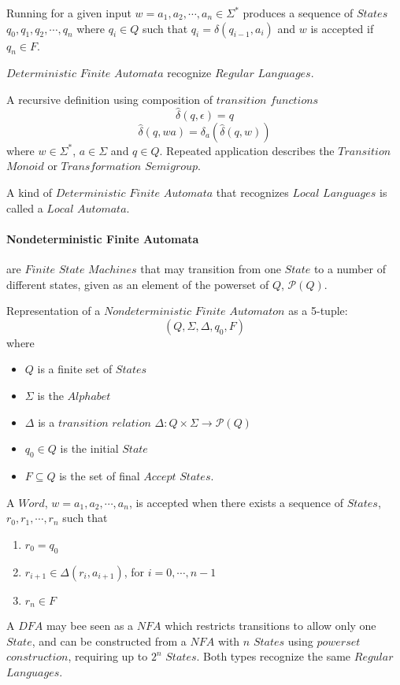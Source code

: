 \documentclass{article}
\begin{document}
Running for a given input $w = a_1,a_2, \cdots , a_n \in \Sigma^*$
produces a sequence of $States$ $q_0,q_1,q_2,\cdots , q_n$ where $q_i
\in Q$ such that $q_i = \delta (q_{i-1},a_i)$ and $w$ is accepted if
$q_n \in F$.

$Deterministic$ $Finite$ $Automata$ recognize $Regular$ $Languages$.

A recursive definition using composition of $transition$ $functions$
\[
    \widehat{\delta}(q,\epsilon) = q
\]\[
    \widehat{\delta}(q,wa) = \delta_a(\widehat{\delta}(q,w))
\]
where $w \in \Sigma^*$, $a \in \Sigma$ and $q \in Q$. Repeated
application describes the $Transition$ $Monoid$ or $Transformation$
$Semigroup$.

A kind of $Deterministic$ $Finite$ $Automata$ that recognizes $Local$
$Languages$ is called a $Local$ $Automata$.

\paragraph{Nondeterministic Finite Automata} are $Finite$ $State$
$Machines$ that may transition from one $State$ to a number of
different states, given as an element of the powerset of $Q$,
$\mathcal{P}(Q)$.

Representation of a $Nondeterministic$ $Finite$ $Automaton$ as a
5-tuple:
\[
    (Q,\Sigma,\Delta,q_0,F)
\]
where
\begin{itemize}
\item $Q$ is a finite set of $States$
\item $\Sigma$ is the $Alphabet$
\item $\Delta$ is a $transition$ $relation$ $\Delta: Q \times
  \Sigma \rightarrow \mathcal{P}(Q)$
\item $q_0 \in Q$ is the initial $State$
\item $F \subseteq Q$ is the set of final $Accept$ $States$.
\end{itemize}

A $Word$, $w=a_1,a_2,\cdots,a_n$, is accepted when there exists a
sequence of $States$, $r_0,r_1,\cdots,r_n$ such that
\begin{enumerate}
\item $r_0 = q_0$
\item $r_{i+1} \in \Delta(r_i, a_{i+1})$, for $i = 0, \cdots, n-1$
\item $r_n \in F$
\end{enumerate}

A $DFA$ may bee seen as a $NFA$ which restricts transitions to allow
only one $State$, and can be constructed from a $NFA$ with $n$
$States$ using $powerset$ $construction$, requiring up to $2^n$
$States$. Both types recognize the same $Regular$ $Languages$.
\end{document}
